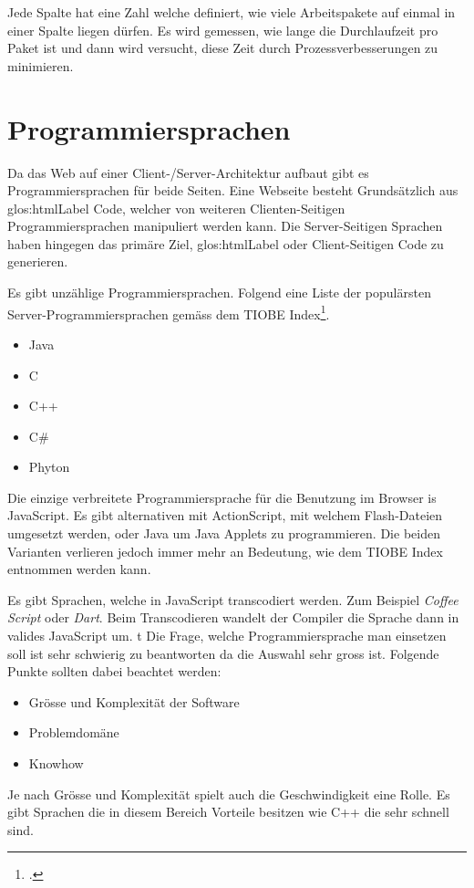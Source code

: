Jede Spalte hat eine Zahl welche definiert, wie viele Arbeitspakete auf einmal in einer Spalte liegen dürfen. Es wird gemessen, wie lange die Durchlaufzeit pro Paket ist und dann wird versucht, diese Zeit durch Prozessverbesserungen zu minimieren. 

\section{Programmiersprachen}
Da das Web auf einer  Client-/Server-Architektur aufbaut gibt es Programmiersprachen für beide Seiten. Eine Webseite besteht Grundsätzlich aus \Gls{glos:htmlLabel} Code, welcher von weiteren Clienten-Seitigen Programmiersprachen manipuliert werden kann. Die Server-Seitigen Sprachen haben hingegen das primäre Ziel, \Gls{glos:htmlLabel} oder Client-Seitigen Code zu generieren.

Es gibt unzählige Programmiersprachen. Folgend eine Liste der populärsten Server-Programmiersprachen gemäss dem TIOBE Index\footcite{TIOBE_Software_Tiobe_Index_2015-06-04}.

\begin{itemize}
\item Java
\item C
\item C++
\item C\#
\item Phyton
\end{itemize}

Die einzige verbreitete Programmiersprache für die Benutzung im Browser is JavaScript. Es gibt alternativen mit ActionScript, mit welchem Flash-Dateien umgesetzt werden, oder Java um Java Applets zu programmieren. Die beiden Varianten verlieren jedoch immer mehr an Bedeutung, wie dem TIOBE Index entnommen werden kann.

Es gibt Sprachen, welche in JavaScript transcodiert werden. Zum Beispiel \textit{Coffee Script} oder \textit{Dart}. Beim Transcodieren wandelt der Compiler die Sprache dann in valides JavaScript um.
t
Die Frage, welche Programmiersprache man einsetzen soll ist sehr schwierig zu beantworten da die Auswahl sehr gross ist. Folgende Punkte sollten dabei beachtet werden:
\begin{itemize}
\item Grösse und Komplexität der Software
\item Problemdomäne
\item Knowhow
\end{itemize}
Je nach Grösse und Komplexität spielt auch die Geschwindigkeit eine Rolle. Es gibt Sprachen die in diesem Bereich Vorteile besitzen wie C++ die sehr schnell sind.


